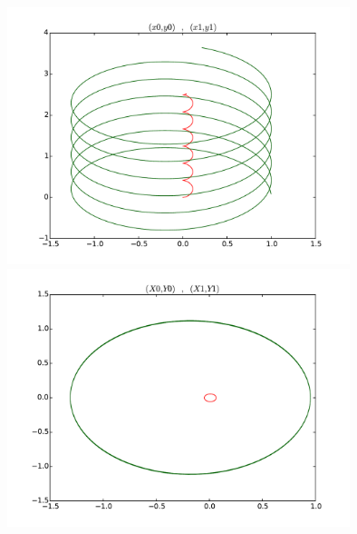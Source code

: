 \newpage

\begin{figure}[h]
  \centering
  \includegraphics[width=10cm]{./Edyngrav_3_fig.pdf}
  \includegraphics[width=10cm]{./Edyngrav_4_fig.pdf}
\end{figure}




